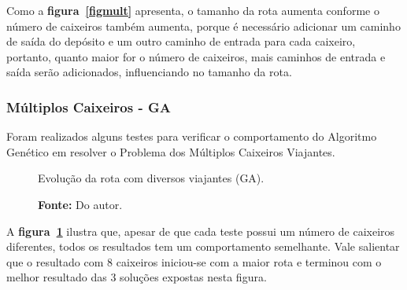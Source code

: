 \documentclass[12pt,openright,a4paper,oneside]{tcc}
\begin{document}
        Como a \textbf{figura~\ref{figmult}} apresenta, o tamanho da rota aumenta conforme o número de caixeiros também aumenta, porque é necessário adicionar um caminho de saída do depósito e um outro caminho de entrada para cada caixeiro, portanto, quanto maior for o número de caixeiros, mais caminhos de entrada e saída serão adicionados, influenciando no tamanho da rota.

        \newpage
		\subsubsection{Múltiplos Caixeiros - GA}

		Foram realizados alguns testes para verificar o comportamento do Algoritmo Genético em resolver o Problema dos Múltiplos Caixeiros Viajantes.

		\begin{figure}[h]
			\centering
            \caption{Evolução da rota com diversos viajantes (GA).}
			\caption*{\textbf{Fonte:} Do autor.}
			\label{figgaga}
		\end{figure}

		A \textbf{figura~\ref{figgaga}} ilustra que, apesar de que cada teste possui um número de caixeiros diferentes, todos os resultados tem um comportamento semelhante. Vale salientar que o resultado com 8 caixeiros iniciou-se com a maior rota e terminou com o melhor resultado das 3 soluções expostas nesta figura.
\end{document}
